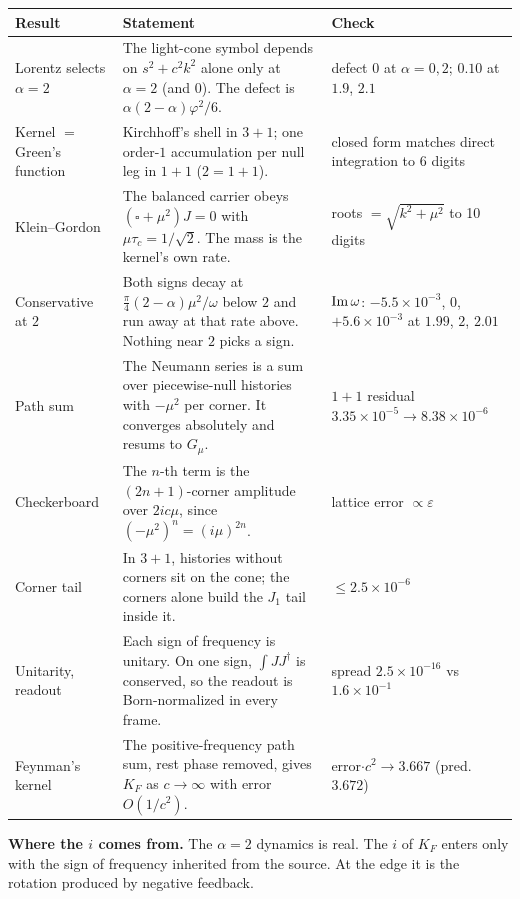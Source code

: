 \documentclass[10pt]{article}
\begin{document}
\medskip
\begin{tabularx}{\textwidth}{@{}P{3.3cm}LP{4.4cm}@{}}
\toprule
\textbf{Result} & \textbf{Statement} & \textbf{Check}\\
\midrule
Lorentz selects $\alpha=2$ & The light-cone symbol depends on $s^2+c^2k^2$ alone only at $\alpha=2$ (and $0$). The defect is $\alpha(2-\alpha)\varphi^2/6$. & defect $0$ at $\alpha=0,2$; $0.10$ at $1.9$, $2.1$\\
Kernel $=$ Green's function & Kirchhoff's shell in $3+1$; one order-$1$ accumulation per null leg in $1+1$ ($2=1+1$). & closed form matches direct integration to 6 digits\\
Klein--Gordon & The balanced carrier obeys $(\square+\mu^2)J=0$ with $\mu\tau_c=1/\sqrt2$. The mass is the kernel's own rate. & roots $=\sqrt{k^2+\mu^2}$ to 10 digits\\
Conservative at $2$ & Both signs decay at $\tfrac\pi4(2-\alpha)\mu^2/\omega$ below $2$ and run away at that rate above. Nothing near $2$ picks a sign. & ${\rm Im}\,\omega$: $-5.5\times10^{-3}$, $0$, $+5.6\times10^{-3}$ at $1.99$, $2$, $2.01$\\
Path sum & The Neumann series is a sum over piecewise-null histories with $-\mu^2$ per corner. It converges absolutely and resums to $G_\mu$. & $1+1$ residual $3.35\times10^{-5}\to8.38\times10^{-6}$\\
Checkerboard & The $n$-th term is the $(2n+1)$-corner amplitude over $2ic\mu$, since $(-\mu^2)^n=(i\mu)^{2n}$. & lattice error $\propto\varepsilon$\\
Corner tail & In $3+1$, histories without corners sit on the cone; the corners alone build the $J_1$ tail inside it. & $\le2.5\times10^{-6}$\\
Unitarity, readout & Each sign of frequency is unitary. On one sign, $\int JJ^\dagger$ is conserved, so the readout is Born-normalized in every frame. & spread $2.5\times10^{-16}$ vs $1.6\times10^{-1}$\\
Feynman's kernel & The positive-frequency path sum, rest phase removed, gives $K_F$ as $c\to\infty$ with error $O(1/c^2)$. & error$\cdot c^2\to3.667$ (pred.\ $3.672$)\\
\bottomrule
\end{tabularx}

\medskip
\textbf{Where the $i$ comes from.} The $\alpha=2$ dynamics is real. The $i$ of $K_F$ enters only with the sign of frequency inherited from the source. At the edge it is the rotation produced by negative feedback.
\end{document}
